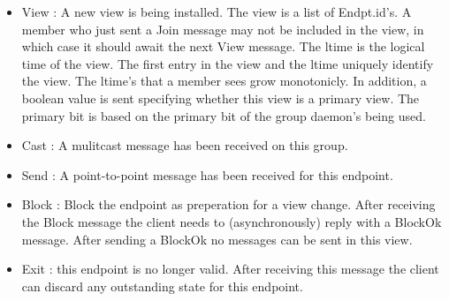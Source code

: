 \begin{itemize}
\item{View} : A new view is being installed. The view is a
list of Endpt.id's.  A member who just sent a Join message may not be
included in the view, in which case it should await the next View
message.  The ltime is the logical time of the view.  The first entry
in the view and the ltime uniquely identify the view.  The ltime's
that a member sees grow monotonicly.  In addition, a boolean value is
sent specifying whether this view is a primary view.  The primary bit
is based on the primary bit of the group daemon's being used.

\begin{FormatTable}
\end{FormatTable}

\item{Cast} : A mulitcast message has been received on this group. 
\begin{FormatTable}
\end{FormatTable}

\item{Send} : A point-to-point message has been received for this
  endpoint. 
\begin{FormatTable}
\end{FormatTable}

\item{Block} : Block the endpoint as preperation for a view
  change. After receiving the Block message the client needs to
  (asynchronously) reply with a BlockOk message. After sending a
  BlockOk no messages can be sent in this view. 
\begin{FormatTable}
\end{FormatTable}

\item{Exit} : this endpoint is no longer valid. After receiving this
  message the client can discard any outstanding state for this
  endpoint. 
\begin{FormatTable}
\end{FormatTable}

\end{itemize}


